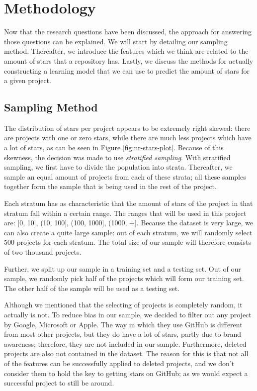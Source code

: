 \section{Methodology}
    Now that the research questions have been discussed, the approach for answering those questions can be explained.
    We will start by detailing our sampling method. 
    Thereafter, we introduce the features which we think are related to the amount of stars that a repository has.
    Lastly, we discuss the methods for actually constructing a learning model that we can use to predict the amount of stars for a given project.
    \subsection{Sampling Method}
        The distribution of stars per project appears to be extremely right skewed: there are projects with one or zero stars, while there are much less projects which have a lot of stars, as can be seen in Figure \ref{fig:nr-stars-plot}.
        Because of this skewness, the decision was made to use \textit{stratified sampling}\cite{TODO}.
        With stratified sampling, we first have to divide the population into strata. 
        Thereafter, we sample an equal amount of projects from each of these strata; 
        all these samples together form the sample that is being used in the rest of the project.
        
        Each stratum has as characteristic that the amount of stars of the project in that stratum fall within a certain range. 
        The ranges that will be used in this project are: [0, 10], (10, 100], (100, 1000], (1000, +].
        Because the dataset is very large, we can also create a quite large sample:         
        out of each stratum, we will randomly select 500 projects for each stratum. The total size of our sample will therefore consists of two thousand projects.
        
        Further, we split up our sample in a training set and a testing set. Out of our sample, we randomly pick half of the projects which will form our training set. The other half of the sample will be used as a testing set.
        
        Although we mentioned that the selecting of projects is completely random, it actually is not. To reduce bias in our sample, we decided to filter out any project by Google, Microsoft or Apple.
        The way in which they use GitHub is different from most other projects, but they do have a lot of stars, partly due to brand awareness; therefore, they are not included in our sample.
        Furthermore, deleted projects are also not contained in the dataset.
        The reason for this is that not all of the features can be successfully applied to deleted projects, and we don't consider them to hold the key to getting stars on GitHub; as we would expect a successful project to still be around.
        
